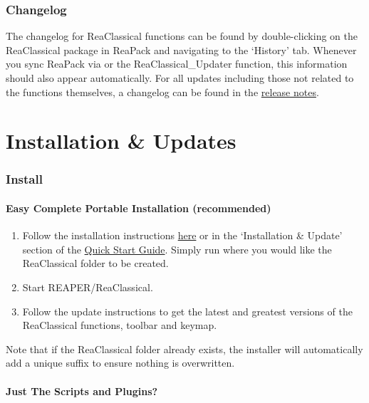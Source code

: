 \documentclass[10pt,american]{article}
\begin{document}
\section{Changelog}

The changelog for ReaClassical functions can be found by double-clicking on the
ReaClassical package in ReaPack and navigating to the `History' tab. Whenever
you sync ReaPack via  or the
ReaClassical\_Updater function, this information should also appear
automatically. For all updates including those not related to the functions
themselves, a changelog can be found in the
\href{https://github.com/chmaha/ReaClassical/raw/main/release_notes.pdf}{release
notes}.

\pagebreak{}

\part{Installation \& Updates}

\section{Install}

\subsection{Easy Complete Portable Installation (recommended)}
\begin{enumerate}
\item Follow the installation instructions
\href{https://github.com/chmaha/ReaClassical/blob/main/install_instructions.md}{here}
or in the `Installation \& Update' section of the
\href{https://reaclassical.org/quick_start_guide.html}{Quick Start Guide}.
Simply run where you would like the ReaClassical folder to be created. 
\item Start REAPER/ReaClassical.
\item Follow the update instructions  to get the
latest and greatest versions of the ReaClassical functions, toolbar and keymap.
\end{enumerate}
Note that if the ReaClassical folder already exists, the installer will
automatically add a unique suffix to ensure nothing is overwritten.

\subsection{Just The Scripts and Plugins?}
\end{document}
